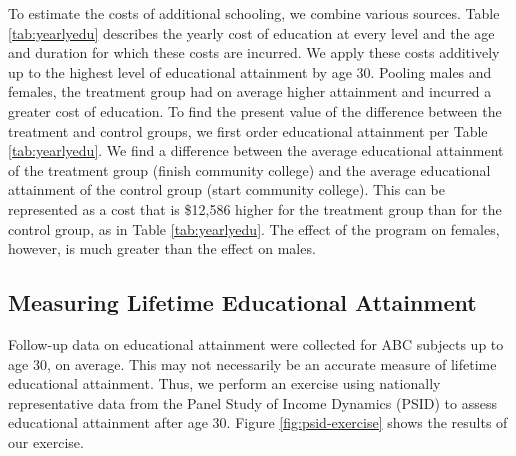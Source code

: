 \noindent To estimate the costs of additional schooling, we combine various sources. Table \ref{tab:yearlyedu}   describes the yearly cost of education at every level and the age and duration for which these costs are incurred. We apply these costs additively up to the highest level of educational attainment by age 30. Pooling males and females, the treatment group had on average higher attainment and incurred a greater cost of education. To find the present value of the difference between the treatment and control groups, we first order educational attainment per Table \ref{tab:yearlyedu}. We find a difference between the average educational attainment of the treatment group (finish community college) and the average educational attainment of the control group (start community college). This can be represented as a cost that is \$12,586 higher for the treatment group than for the control group, as in Table \ref{tab:yearlyedu}. The effect of the program on females, however, is much greater than the effect on males.

\subsection{Measuring Lifetime Educational Attainment}

\noindent Follow-up data on educational attainment were collected for ABC subjects up to age 30, on average. This may not necessarily be an accurate measure of lifetime educational attainment. Thus, we perform an exercise using nationally representative data from the Panel Study of Income Dynamics (PSID) to assess educational attainment after age 30. Figure \ref{fig:psid-exercise} shows the results of our exercise. \\

